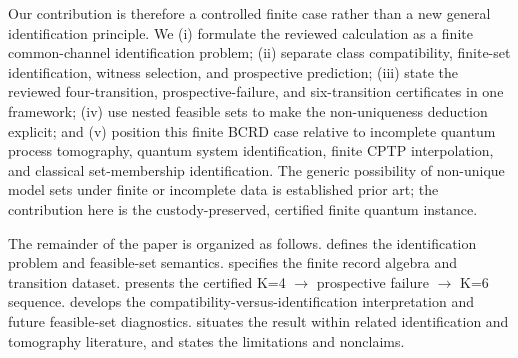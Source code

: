 Our contribution is therefore a controlled finite case rather than a new general identification principle.  We (i) formulate the reviewed calculation as a finite common-channel identification problem; (ii) separate class compatibility, finite-set identification, witness selection, and prospective prediction; (iii) state the reviewed four-transition, prospective-failure, and six-transition certificates in one framework; (iv) use nested feasible sets to make the non-uniqueness deduction explicit; and (v) position this finite BCRD case relative to incomplete quantum process tomography, quantum system identification, finite CPTP interpolation, and classical set-membership identification.  The generic possibility of non-unique model sets under finite or incomplete data is established prior art; the contribution here is the custody-preserved, certified finite quantum instance.

The remainder of the paper is organized as follows.   defines the identification problem and feasible-set semantics.   specifies the finite record algebra and transition dataset.   presents the certified K=4 $\rightarrow$ prospective failure $\rightarrow$ K=6 sequence.   develops the compatibility-versus-identification interpretation and future feasible-set diagnostics.   situates the result within related identification and tomography literature, and  states the limitations and nonclaims.
